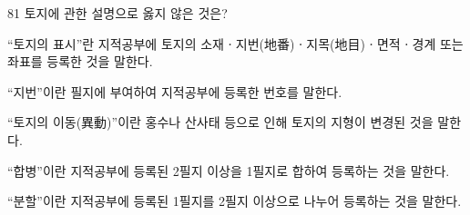 \begin{question}{81}
토지에 관한 설명으로 옳지 않은 것은?
\begin{choices}
  \item “토지의 표시”란 지적공부에 토지의 소재ㆍ지번(地番)ㆍ지목(地目)ㆍ면적ㆍ경계 또는 좌표를 등록한 것을 말한다.
  \item “지번”이란 필지에 부여하여 지적공부에 등록한 번호를 말한다.
  \item “토지의 이동(異動)”이란 홍수나 산사태 등으로 인해 토지의 지형이 변경된 것을 말한다.
  \item “합병”이란 지적공부에 등록된 2필지 이상을 1필지로 합하여 등록하는 것을 말한다.
  \item “분할”이란 지적공부에 등록된 1필지를 2필지 이상으로 나누어 등록하는 것을 말한다.
\end{choices}
\end{question}
